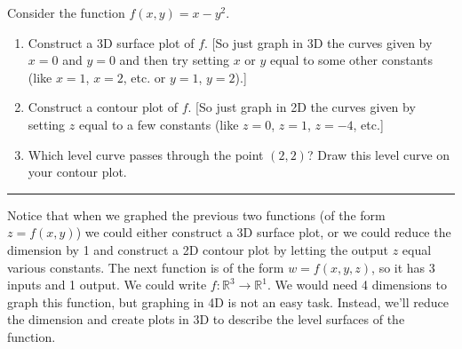 \begin{problem}%

%
 Consider the function $f(x,y)=x-y^2$.
\begin{enumerate}
 \item Construct a 3D surface plot of $f$. [So just graph in 3D the curves given by $x=0$ and $y=0$ and then try setting $x$ or $y$ equal to some other constants (like $x=1$, $x=2$, etc. or $y=1$, $y=2$).]
 \item Construct a contour plot of $f$. [So just graph in 2D the curves given by setting $z$ equal to a few constants (like $z=0$, $z=1$, $z=-4$, etc.]
 \item%
%
Which level curve passes through the point $(2,2)$?  Draw this level curve on your contour plot.
\end{enumerate}
\hrule\end{problem}

Notice that when we graphed the previous two functions (of the form $z=f(x,y)$) we could either construct a 3D surface plot, or we could reduce the dimension by 1 and construct a 2D contour plot by letting the output $z$ equal various constants. 
The next function is of the form $w=f(x,y,z)$, so it has 3 inputs and 1 output.  We could write $f:\mathbb{R}^3\to\mathbb{R}^1$. We would need 4 dimensions to graph this function, but graphing in 4D is not an easy task.  Instead, we'll reduce the dimension and create plots in 3D to describe the level surfaces of the function.

